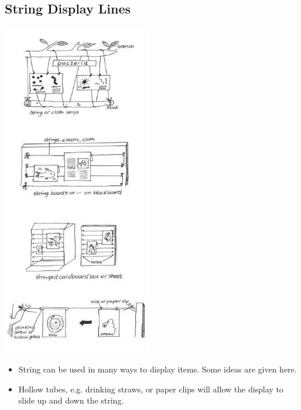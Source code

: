 \begin{multicols}{2}
%

\subsection{String Display Lines}

\begin{center}
\includegraphics[width=0.49\textwidth]{./img/vso/string-display.jpg}
\end{center}

\begin{itemize}
\item String can be used in many ways to display items. Some ideas are given here.
\item Hollow tubes, e.g. drinking
straws, or paper clips will allow
the display to slide up and
down the string.
\end{itemize}

\vfill
\columnbreak


\end{multicols}
